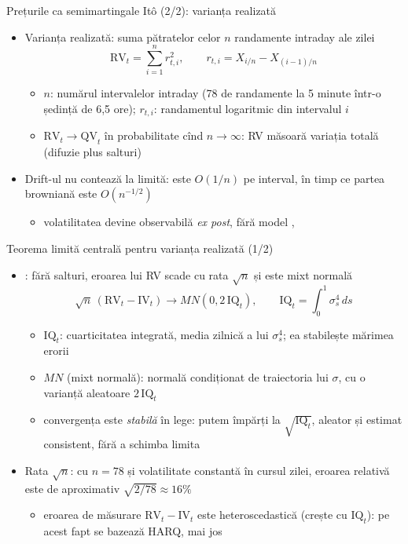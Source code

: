 \begin{frame}{Prețurile ca semimartingale Itô (2/2): varianța realizată}
\itemsize{\small}
\begin{itemize}
    \item Varianța realizată: suma pătratelor celor $n$ randamente intraday ale zilei
    \[ \mathrm{RV}_t = \sum_{i=1}^n r_{t,i}^2, \qquad r_{t,i} = X_{i/n} - X_{(i-1)/n} \]
    \begin{itemize}
        \item $n$: numărul intervalelor intraday (78 de randamente la 5 minute într-o ședință de 6,5 ore); $r_{t,i}$: randamentul logaritmic din intervalul $i$
        \item $\mathrm{RV}_t \to \mathrm{QV}_t$ în probabilitate cînd $n \to \infty$: RV măsoară variația totală (difuzie plus salturi)
    \end{itemize}
    \item Drift-ul nu contează la limită: este $O(1/n)$ pe interval, în timp ce partea browniană este $O(n^{-1/2})$
    \begin{itemize}
        \item volatilitatea devine observabilă \emph{ex post}, fără model , 
    \end{itemize}
\end{itemize}
\end{frame}

\begin{frame}{Teorema limită centrală pentru varianța realizată (1/2)}
\itemsize{\small}
\begin{itemize}
    \item {}: fără salturi, eroarea lui RV scade cu rata $\sqrt n$ și este mixt normală
    \[ \sqrt n\,(\mathrm{RV}_t - \mathrm{IV}_t) \to MN(0, 2\,\mathrm{IQ}_t), \qquad \mathrm{IQ}_t = \int_0^1\sigma^4_s\,ds \]
    \begin{itemize}
        \item $\mathrm{IQ}_t$: cuarticitatea integrată, media zilnică a lui $\sigma^4_s$; ea stabilește mărimea erorii
        \item $MN$ (mixt normală): normală condiționat de traiectoria lui $\sigma$, cu o varianță aleatoare $2\,\mathrm{IQ}_t$
        \item convergența este \emph{stabilă} în lege: putem împărți la $\sqrt{\mathrm{IQ}_t}$, aleator și estimat consistent, fără a schimba limita
    \end{itemize}
    \item Rata $\sqrt n$: cu $n = 78$ și volatilitate constantă în cursul zilei, eroarea relativă este de aproximativ $\sqrt{2/78} \approx 16\%$
    \begin{itemize}
        \item eroarea de măsurare $\mathrm{RV}_t - \mathrm{IV}_t$ este heteroscedastică (crește cu $\mathrm{IQ}_t$): pe acest fapt se bazează HARQ, mai jos
    \end{itemize}
\end{itemize}
\end{frame}

